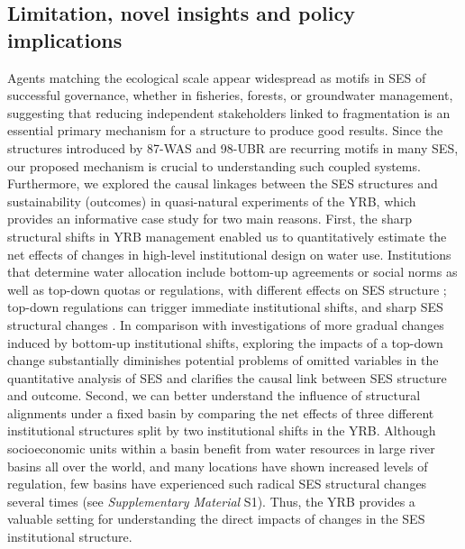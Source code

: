 
\subsection{Limitation, novel insights and policy implications}
\label{insights}

Agents matching the ecological scale appear widespread as motifs in SES of successful governance, whether in fisheries, forests, or groundwater management, suggesting that reducing independent stakeholders linked to fragmentation is an essential primary mechanism for a structure to produce good results.
Since the structures introduced by 87-WAS and 98-UBR are recurring motifs in many SES, our proposed mechanism is crucial to understanding such coupled systems.
Furthermore, we explored the causal linkages between the SES structures and sustainability (outcomes) in quasi-natural experiments of the YRB, which provides an informative case study for two main reasons.
First, the sharp structural shifts in YRB management enabled us to quantitatively estimate the net effects of changes in high-level institutional design on water use. Institutions that determine water allocation include bottom-up agreements or social norms as well as top-down quotas or regulations, with different effects on SES structure \cite{wang2019d,speed2013}; top-down regulations can trigger immediate institutional shifts, and sharp SES structural changes \cite{speed2013,roland2004}.
In comparison with investigations of more gradual changes induced by bottom-up institutional shifts, exploring the impacts of a top-down change substantially diminishes potential problems of omitted variables in the quantitative analysis of SES and clarifies the causal link between SES structure and outcome.
Second, we can better understand the influence of structural alignments under a fixed basin by comparing the net effects of three different institutional structures split by two institutional shifts in the YRB. Although socioeconomic units within a basin benefit from water resources in large river basins all over the world, and many locations have shown increased levels of regulation, few basins have experienced such radical SES structural changes several times (see \textit{Supplementary Material} S1). Thus, the YRB provides a valuable setting for understanding the direct impacts of changes in the SES institutional structure.

